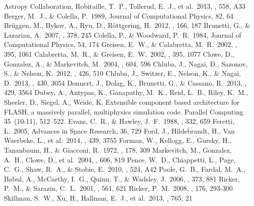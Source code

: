 \documentclass{emulateapj}
\begin{document}
\begin{thebibliography}{}
 Astropy Collaboration, Robitaille, T.~P., Tollerud, E.~J., et al.\ 2013, \aap, 558, A33
 Berger, M.~J., \& Colella, P.\ 1989, Journal of Computational Physics, 82, 64
 Br{\"u}ggen, M., Bykov, A., Ryu, D., R{\"o}ttgering, H.\ 2012, \ssr, 166, 187
 Brunetti, G., \& Lazarian, A.\ 2007, \mnras, 378, 245
 Colella, P., \& Woodward, P.~R.\ 1984, Journal of Computational Physics, 54, 174
 Greisen, E.~W., \& Calabretta, M.~R.\ 2002, \aap, 395, 1061
 Calabretta, M.~R., \& Greisen, E.~W.\ 2002, \aap, 395, 1077
 Clowe, D., Gonzalez, A., \& Markevitch, M.\ 2004, \apj, 604, 596
 Chluba, J., Nagai, D., Sazonov, S., \& Nelson, K.\ 2012, \mnras, 426, 510
 Chluba, J., Switzer, E., Nelson, K., \& Nagai, D.\ 2013, \mnras, 430, 3054
 Donnert, J., Dolag, K., Brunetti, G., \& Cassano, R.\ 2013, \mnras, 429, 3564
 {Dubey}, A., {Antypas}, K.,
  {Ganapathy}, M.~K., {Reid}, L.~B., {Riley}, K.~M., {Sheeler}, D.,
  {Siegel}, A., {Weide}, K. Extensible component based architecture
  for FLASH, a massively parallel, multiphysics simulation
  code. Parallel Computing 35~(10-11), 512--522.
 Evans, C.~R., \& Hawley, J.~F.\ 1988, \apj, 332, 659
 Feretti, L.\ 2005, Advances in Space Research, 36, 729
 Ford, J., Hildebrandt, H., Van Waerbeke, L., et al.\ 2014, \mnras, 439, 3755
 Forman, W., Kellogg, E., Gursky, H., Tananbaum, H., \& Giacconi, R.\ 1972, \apj, 178, 309
 Markevitch, M., Gonzalez, A.~H., Clowe, D., et al.\ 2004, \apj, 606, 819
 Pence, W.~D., Chiappetti, L., Page, C.~G., Shaw, R.~A., \& Stobie, E.\ 2010, \aap, 524, A42
 Poole, G.~B., Fardal, M.~A., Babul, A., McCarthy, I.~G., Quinn, T., \& Wadsley, J.\ 2006, \mnras, 373, 881
 Ricker, P.~M., \& Sarazin, C.~L.\ 2001, \apj, 561, 621
 Ricker, P.~M.\ 2008, \apjs, 176, 293-300
 Skillman, S.~W., Xu, H., Hallman, E.~J., et al.\ 2013, \apj, 765, 21

\end{thebibliography}
\end{document}
